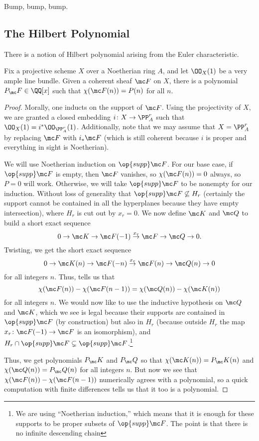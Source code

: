 \documentclass[../notes.tex]{subfiles}
\begin{document}
Bump, bump, bump.

\subsection{The Hilbert Polynomial}
There is a notion of Hilbert polynomial arising from the Euler characteristic.
\begin{proposition}
	Fix a projective scheme $X$ over a Noetherian ring $A$, and let $\OO_X(1)$ be a very ample line bundle. Given a coherent sheaf $\mc F$ on $X$, there is a polynomial $P_\mc F\in\QQ[x]$ such that $\chi(\mc F(n))=P(n)$ for all $n$.
\end{proposition}
\begin{proof}
	Morally, one inducts on the support of $\mc F$. Using the projectivity of $X$, we are granted a closed embedding $i\colon X\to\PP^r_A$ such that $\OO_X(1)=i^*\OO_{\PP^r_A}(1)$. Additionally, note that we may assume that $X=\PP^r_A$ by replacing $\mc F$ with $i_*\mc F$ (which is still coherent because $i$ is proper and everything in sight is Noetherian).

	We will use Noetherian induction on $\op{supp}\mc F$. For our base case, if $\op{supp}\mc F$ is empty, then $\mc F$ vanishes, so $\chi(\mc F(n))=0$ always, so $P=0$ will work. Otherwise, we will take $\op{supp}\mc F$ to be nonempty for our induction. Without loss of generality that $\op{supp}\mc F\not\subseteq H_r$ (certainly the support cannot be contained in all the hyperplanes because they have empty intersection), where $H_r$ is cut out by $x_r=0$. We now define $\mc K$ and $\mc Q$ to build a short exact sequence
	\[0\to\mc K\to\mc F(-1)\stackrel{x_r}\to\mc F\to\mc Q\to0.\]
	Twisting, we get the short exact sequence
	\[0\to\mc K(n)\to\mc F(-n)\stackrel{x_r}\to\mc F(n)\to\mc Q(n)\to0\]
	for all integers $n$. Thus,  tells us that
	\[\chi(\mc F(n))-\chi(\mc F(n-1))=\chi(\mc Q(n))-\chi(\mc K(n))\]
	for all integers $n$. We would now like to use the inductive hypothesis on $\mc Q$ and $\mc K$, which we see is legal because their supports are contained in $\op{supp}\mc F$ (by construction) but also in $H_r$ (because outside $H_r$ the map $x_r\colon\mc F(-1)\to\mc F$ is an isomorphism), and $H_r\cap\op{supp}\mc F\subsetneq\op{supp}\mc F$.\footnote{We are using ``Noetherian induction,'' which means that it is enough for these supports to be proper subsets of $\op{supp}\mc F$. The point is that there is no infinite descending chain}
	
	Thus, we get polynomials $P_\mc K$ and $P_\mc Q$ so that $\chi(\mc K(n))=P_\mc K(n)$ and $\chi(\mc Q(n))=P_\mc Q(n)$ for all integers $n$. But now we see that $\chi(\mc F(n))-\chi(\mc F(n-1))$ numerically agrees with a polynomial, so a quick computation with finite differences tells us that it too is a polynomial.
\end{proof}
\end{document}
